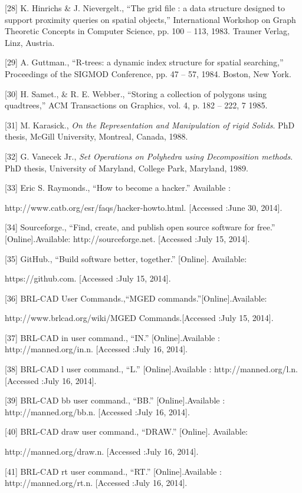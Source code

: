 \documentclass[11pt, oneside]{Thesis} %
\begin{document}
[28] K. Hinrichs \& J. Nievergelt., “The grid file : a data structure designed to support
proximity queries on spatial objects,” International Workshop on Graph Theoretic Concepts
 in Computer Science, pp. 100 – 113, 1983. Trauner Verlag, Linz, Austria.

[29] A. Guttman., “R-trees: a dynamic index structure for spatial searching,” Proceedings
of the SIGMOD Conference, pp. 47 – 57, 1984. Boston, New York.

[30] H. Samet., \& R. E. Webber., “Storing a collection of polygons using quadtrees,” ACM
Transactions on Graphics, vol. 4, p. 182 – 222, 7 1985.

[31] M. Karasick., \textit{On the Representation and Manipulation of rigid Solids}. PhD thesis,
McGill University, Montreal, Canada, 1988.

[32] G. Vanecek Jr., \textit{Set Operations on Polyhedra using Decomposition methods}. PhD
thesis, University of Maryland, College Park, Maryland, 1989.

[33] Eric S. Raymonds., “How to become a hacker.” Available : 

http://www.catb.org/esr/faqs/hacker-howto.html. [Accessed :June 30, 2014].

[34] Sourceforge., “Find, create, and publish open source software for free.” 
[Online].Available: http://sourceforge.net. [Accessed :July 15, 2014].

[35] GitHub., “Build software better, together.” [Online]. Available: 

https://github.com. [Accessed :July 15, 2014].

[36] BRL-CAD User Commands.,“MGED commands.”[Online].Available:

http://www.brlcad.org/wiki/MGED Commands.[Accessed :July 15, 2014].

[37] BRL-CAD in user command., “IN.” [Online].Available : http://manned.org/in.n. 
[Accessed :July 16, 2014].

[38] BRL-CAD l user command., “L.” [Online].Available : http://manned.org/l.n. 
[Accessed :July 16, 2014].

[39] BRL-CAD bb user command., “BB.” [Online].Available : http://manned.org/bb.n. 
[Accessed :July 16, 2014].

[40] BRL-CAD draw user command., “DRAW.” [Online]. Available:

http://manned.org/draw.n. [Accessed :July 16, 2014].

[41] BRL-CAD rt user command., “RT.” [Online].Available : http://manned.org/rt.n. 
[Accessed :July 16, 2014].
\end{document}
